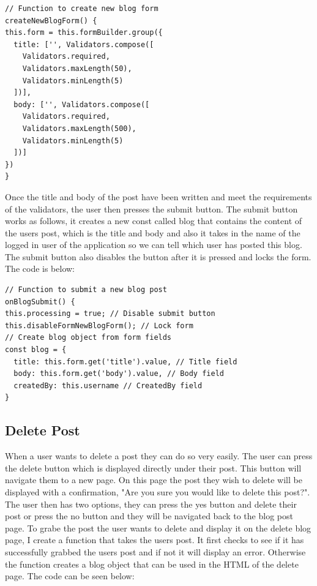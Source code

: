\begin{lstlisting}
// Function to create new blog form
createNewBlogForm() {
this.form = this.formBuilder.group({
  title: ['', Validators.compose([
    Validators.required,
    Validators.maxLength(50),
    Validators.minLength(5)
  ])],
  body: ['', Validators.compose([
    Validators.required,
    Validators.maxLength(500),
    Validators.minLength(5)
  ])]
})
}
\end{lstlisting}

Once the title and body of the post have been written and meet the requirements of the validators, the user then presses the submit button. The submit button works as follows, it creates a new const called blog that contains the content of the users post, which is the title and body and also it takes in the name of the logged in user of the application so we can tell which user has posted this blog. The submit button also disables the button after it is pressed and locks the form. The code is below:

\begin{lstlisting}
// Function to submit a new blog post
onBlogSubmit() {
this.processing = true; // Disable submit button
this.disableFormNewBlogForm(); // Lock form
// Create blog object from form fields
const blog = {
  title: this.form.get('title').value, // Title field
  body: this.form.get('body').value, // Body field
  createdBy: this.username // CreatedBy field
}
\end{lstlisting}

\subsection{Delete Post}
When a user wants to delete a post they can do so very easily. The user can press the delete button which is displayed directly under their post. This button will navigate them to a new page. On this page the post they wish to delete will be displayed with a confirmation, "Are you sure you would like to delete this post?". The user then has two options, they can press the yes button and delete their post or press the no button and they will be navigated back to the blog post page. To grabe the post the user wants to delete and display it on the delete blog page, I create a function that takes the users post. It first checks to see if it has successfully grabbed the users post and if not it will display an error. Otherwise the function creates a blog object that can be used in the HTML of the delete page. The code can be seen below:


